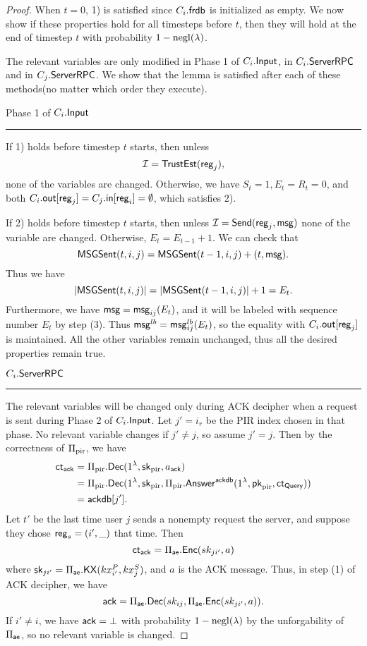 \begin{proof}
When $t = 0$, 1) is satisfied since $C_i.\mathsf{frdb}$ is initialized as empty. We now show if these properties hold for all timesteps before $t$, then they will hold at the end of timestep $t$ with probability $1 - \operatorname{negl}(\lambda)$.

The relevant variables are only modified in Phase 1 of $C_i.\mathsf{Input}$, in $C_i.\mathsf{ServerRPC}$ and in $C_j.\mathsf{ServerRPC}$. We show that the lemma is satisfied after each of these methods(no matter which order they execute).

Phase 1 of $C_i.\mathsf{Input}$
\hrule
If 1) holds before timestep $t$ starts, then unless 
$$\mathcal{I} = \mathsf{TrustEst}(\mathsf{reg}_j),$$
none of the variables are changed. Otherwise, we have $S_t = 1, E_t = R_t = 0$, and both $C_i.\mathsf{out}[\mathsf{reg}_j] = C_j.\mathsf{in}[\mathsf{reg}_i] = \emptyset$, which satisfies 2).

If 2) holds before timestep $t$ starts, then unless $\mathcal{I} = \mathsf{Send}(\mathsf{reg}_j, \mathsf{msg})$ none of the variable are changed. Otherwise, $E_t = E_{t - 1} + 1$. We can check that
$$\mathsf{MSGSent}(t, i, j) = \mathsf{MSGSent}(t - 1, i, j) + (t, \mathsf{msg}).$$
Thus we have
$$\left| \mathsf{MSGSent}(t, i, j) \right| = \left| \mathsf{MSGSent}(t - 1, i, j) \right| + 1 = E_t.$$
Furthermore, we have $\mathsf{msg} = \mathsf{msg}_{ij}(E_t)$, and it will be labeled with sequence number $E_t$ by step (3). Thus $\mathsf{msg}^{lb} = \mathsf{msg}^{lb}_{ij}(E_t)$, so the equality with $C_i.\mathsf{out}[\mathsf{reg}_j]$ is maintained. All the other variables remain unchanged, thus all the desired properties remain true.

\vspace{10pt}
$C_i.\mathsf{ServerRPC}$
\hrule
The relevant variables will be changed only during ACK decipher when a request is sent during Phase 2 of $C_i.\mathsf{Input}$. Let $j' = i_r$ be the PIR index chosen in that phase. No relevant variable changes if $j' \neq j$, so assume $j' = j$. Then by the correctness of $\Pi_{\text{pir}}$, we have
\begin{align*}
 \mathsf{ct}_{\mathsf{ack}} &= \Pi_{\text{pir}}.\mathsf{Dec}(1^{\lambda}, {\mathsf{sk}}_{\text{pir}}, a_{\mathsf{ack}})   \\
 &= \Pi_{\text{pir}}.\mathsf{Dec}(1^{\lambda}, {\mathsf{sk}}_{\text{pir}}, \Pi_{\text{pir}}.\mathsf{Answer}^{\mathsf{ackdb}}(1^{\lambda}, \mathsf{pk}_{\text{pir}}, \mathsf{ct}_{\mathsf{Query}})) \\
 &= \mathsf{ackdb}[j'].
\end{align*}
Let $t'$ be the last time user $j$ sends a nonempty request the server, and suppose they chose $\mathsf{reg}_s = (i', \_)$ that time. Then
$$\mathsf{ct}_{\mathsf{ack}} = \Pi_{\mathsf{ae}}.\mathsf{Enc}(sk_{ji'}, a)$$
where ${\mathsf{sk}}_{ji'} = \Pi_{\mathsf{ae}}.\mathsf{KX}(kx_{i'}^P, kx_{j}^S)$, and $a$ is the ACK message. Thus, in step (1) of ACK decipher, we have
$$\mathsf{ack} = \Pi_{\mathsf{ae}}.\mathsf{Dec}(sk_{ij}, \Pi_{\mathsf{ae}}.\mathsf{Enc}(sk_{ji'}, a)).$$
If $i' \neq i$, we have $\mathsf{ack} = \bot$ with probability $1 - \operatorname{negl}(\lambda)$ by the unforgability of $\Pi_{\mathsf{ae}}$, so no relevant variable is changed. 


\end{proof}
